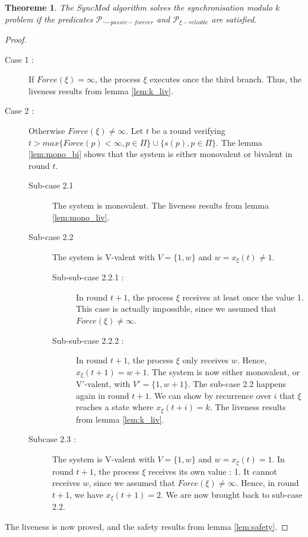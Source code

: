 \documentclass{article}
\newtheorem{theorem}{Theoreme}
\begin{document}
\begin{theorem}
	The SyncMod algorithm solves the synchronisation modulo $k$ problem if the predicates $\mathcal{P}_{\neg-passiv-forever}$
	and $\mathcal{P}_{\xi-reliable}$ are satisfied.
\end{theorem}
\begin{proof}
	\begin{description}
		\item[Case 1 : ] If $Force(\xi) = \infty$, the process $\xi$ executes once the third branch.
			Thus, the liveness results from lemma \ref{lem:k_liv}.

		\item[Case 2 :] Otherwise $Force(\xi) \neq \infty$.
			Let $t$ be a round verifying $t > max \{Force(p) < \infty, p \in \Pi\} \cup \{s(p), p \in \Pi\}$.
			The lemma \ref{lem:mono_bi} shows that the system is either monovalent or bivalent in round $t$.
			\begin{description}
				\item[Sub-case 2.1] The system is monovalent. The liveness results from lemma \ref{lem:mono_liv}.
				\item[Sub-case 2.2] The system is V-valent with $V = \{1, w\}$ and $w = x_\xi(t) \neq 1$.
					\begin{description}
						\item[Sub-sub-case 2.2.1 : ] In round $t+1$, the process $\xi$ receives at least once
							the value 1.
							This case is actually impossible, since we assumed that $Force(\xi) \neq \infty$.
						\item[Sub-sub-case 2.2.2 : ] In round $t+1$, the process $\xi$ only receives $w$.
							Hence, $x_\xi(t+1) = w+1$. The system is now either monovalent,
							or V'-valent, with $V' = \{1, w+1\}$.
							The sub-case 2.2 happens again in round $t+1$.
							We can show by recurrence over $i$ that $\xi$ reaches a state where $x_\xi(t+i) = k$.
							The liveness results from lemma \ref{lem:k_liv}.
					\end{description}
				\item[Subcase 2.3 : ] The system is V-valent with $V = \{1, w\}$ and $w = x_\xi(t) = 1$.
					In round $t+1$, the process $\xi$ receives its own value : 1.
					It cannot receives $w$, since we assumed that $Force(\xi) \neq \infty$.
					Hence, in round $t+1$, we have $x_\xi(t+1) = 2$.
					We are now brought back to sub-case 2.2.
			\end{description}
	\end{description}
	The liveness is now proved, and the safety results from lemma \ref{lem:safety}.
\end{proof}
\end{document}
